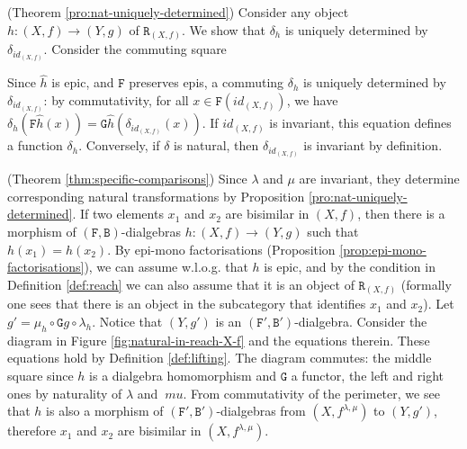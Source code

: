 \documentclass[orivec]{llncs}
\newcommand{\obj}[3]{\node (#1) [#2] {$#3$};}
\newcommand{\arr}[3]{\path[->,font=\scriptsize](#2) edge node[auto] {$#1$} (#3);}
\newcommand{\mC}[1]{\mathtt{#1}}
\newcommand{\mF}[1]{\mathtt{#1}}
\newcommand{\F}{\mF{F}}
\newcommand{\G}{\mF{G}}
\newcommand{\B}{\mF{B}}
\newcommand{\reach}{\mC{R}}
\newcommand{\id}{\mathit{id}}
\newcommand{\proend}{\medskip}
\renewenvironment{proof}{\begin{pro}}{\proend\end{pro}}
\begin{document}
\begin{proof}(Theorem \ref{pro:nat-uniquely-determined})
Consider any object $h : (X,f) \to (Y,g)$ of $\reach_{(X,f)}$. We show that $\delta_h$ is uniquely determined by $\delta_{id_{(X,f)}}$. 
	Consider the commuting square
	\begin{center}
	\end{center} 
Since $\hat h$ is epic, and $\F$ preserves epis, a commuting $\delta_{h}$ is uniquely determined by $\delta_{\id_{(X,f)}}$: by commutativity, for all $x \in \F (\id_{(X,f)})$, we have $\delta_{h}(\F \hat h(x)) = \G \hat h (\delta_{\id_{(X,f)}}(x))$.  If $\id_{(X,f)}$ is invariant, this equation defines a function $\delta_h$. Conversely, if $\delta$ is natural, then $\delta_{\id_{(X,f)}}$ is invariant by definition.
\end{proof}

\begin{proof}(Theorem \ref{thm:specific-comparisons})
Since $\lambda$ and $\mu$ are invariant, they determine corresponding natural transformations by Proposition \ref{pro:nat-uniquely-determined}. If two elements $x_1$ and $x_2$ are bisimilar in $(X,f)$, then there is a morphism of $(\F,\B)$-dialgebras $h : (X,f) \to (Y,g)$ such that $h(x_1) = h(x_2)$. By epi-mono factorisations (Proposition \ref{prop:epi-mono-factorisations}), we can assume w.l.o.g. that $h$ is epic, and by the condition in Definition \ref{def:reach} we can also assume that it is an object of $\reach_{(X,f)}$ (formally one sees that there is an object in the subcategory that identifies $x_1$ and $x_2$). Let $g' = \mu_h \circ \G g \circ \lambda_h$. Notice that $(Y,g')$ is an $(\F',\B')$-dialgebra. Consider the diagram in Figure \ref{fig:natural-in-reach-X-f} and the equations therein. These equations hold by Definition \ref{def:lifting}.  The diagram commutes: the middle square since $h$ is a dialgebra homomorphism and $\G$ a functor, the left and right ones by naturality of $\lambda$ and $\
mu$. From commutativity of the perimeter, we see that $h$ is also a morphism of $(\F',\B')$-dialgebras from $(X,f^{\lambda,\mu})$ to $(Y,g')$, therefore $x_1$ and $x_2$ are bisimilar in $(X,f^{\lambda,\mu})$.
\end{proof}
\end{document}
